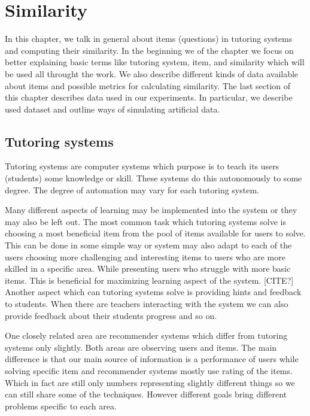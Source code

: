 \documentclass[
  digital, %
  table,   %
  nolof,     %
  nolot,     %
  nocover
]{fithesis3}
\begin{document}
\chapter{Similarity}




In this chapter, we talk in general about items (questions) in tutoring systems and computing their similarity. In the beginning we of the chapter we focus on better explaining basic terms like tutoring system, item, and similarity which will be used all throught the work. We also describe different kinds of data available about items and possible metrics for calculating similarity.
The last section of this chapter describes data used in our experiments. In particular, we describe used dataset and outline ways of simulating artificial data.

\section{Tutoring systems}\label{tutoring-systems}


Tutoring systems are computer systems which purpose is to teach its users (students) some knowledge or skill. These systems do this autonomously to some degree. The degree of automation may vary for each tutoring system.


Many different aspects of learning may be implemented into the system or they may also be left out. The most common task which tutoring systems solve is choosing a most beneficial item from the pool of items available for users to solve. This can be done in some simple way or system may also adapt to each of the users choosing more challenging and interesting items to users who are more skilled in a specific area. While presenting users who struggle with more basic items. This is beneficial for maximizing learning aspect of the system. [CITE?] Another aspect which can tutoring systems solve is providing hints and feedback to students. When there are teachers interacting with the system we can also provide feedback about their students progress and so on.


One closely related area are recommender systems which differ from tutoring systems only slightly. Both areas are observing users and items. The main difference is that our main source of information is a performance of users while solving specific item and recommender systems mostly use rating of the items. Which in fact are still only numbers representing slightly different things so we can still share some of the techniques. However different goals bring different problems specific to each area.
\end{document}
